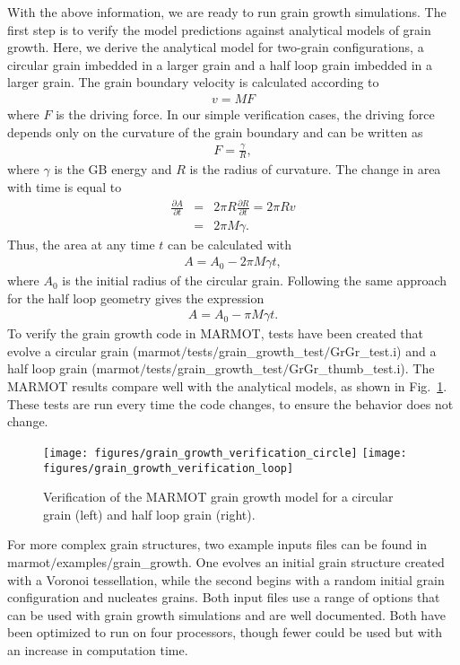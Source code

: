\documentclass[letter,12pt,fleqn]{article}
\begin{document}
With the above information, we are ready to run grain growth simulations. The first step is to verify the model predictions against analytical models of grain growth. Here, we derive the analytical model for two-grain configurations, a circular grain imbedded in a larger grain and a half loop grain imbedded in a larger grain. The grain boundary velocity is calculated according to
\begin{eqnarray}
	v = M F
\end{eqnarray}
where $F$ is the driving force. In our simple verification cases, the driving force depends only on the curvature of the grain boundary and can be written as
\begin{eqnarray}
	F = \frac{\gamma}{R},
\end{eqnarray}
where $\gamma$ is the GB energy and $R$ is the radius of curvature. The change in area with time is equal to
\begin{eqnarray}
\frac{\partial A}{\partial t} &=& 2 \pi R \frac{\partial R}{\partial t} = 2 \pi R v\\
&=& 2 \pi M \gamma.
\end{eqnarray}
Thus, the area at any time $t$ can be calculated with
\begin{eqnarray}
	A = A_0 - 2 \pi M \gamma t,
\end{eqnarray}
where $A_0$ is the initial radius of the circular grain. Following the same approach for the half loop geometry gives the expression
\begin{eqnarray}
	A = A_0 - \pi M \gamma t.
\end{eqnarray}
To verify the grain growth code in MARMOT, tests have been created that evolve a circular grain (marmot$/$tests$/$grain\_growth\_test$/$GrGr\_test.i) and a half loop grain (marmot$/$tests$/$grain\_growth\_test$/$GrGr\_thumb\_test.i). The MARMOT results compare well with the analytical models, as shown in Fig.~\ref{fig:GrGr_tests}. These tests are run every time the code changes, to ensure the behavior does not change.
\begin{figure}[t]
  \centering
  \texttt{[image: figures/grain\_growth\_verification\_circle]}
  \texttt{[image: figures/grain\_growth\_verification\_loop]}
  \caption{Verification of the MARMOT grain growth model for a circular grain (left) and half loop grain (right).}\label{fig:GrGr_tests}
\end{figure}

For more complex grain structures, two example inputs files can be found in marmot$/$examples$/$grain\_growth. One evolves an initial grain structure created with a Voronoi tessellation, while the second begins with a random initial grain configuration and nucleates grains. Both input files use a range of options that can be used with grain growth simulations and are well documented. Both have been optimized to run on four processors, though fewer could be used but with an increase in computation time.
\end{document}
